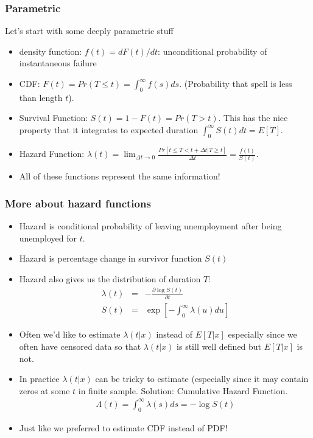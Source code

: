 \documentclass[xcolor=pdftex,dvipsnames,table,mathserif]{beamer}
\begin{document}
\begin{frame}
\frametitle{Parametric}
Let's start with some deeply parametric stuff
\begin{itemize}
\item density function: $f(t) = d F(t) / dt$: unconditional probability of instantaneous failure
\item CDF: $F(t) = Pr(T \leq t) = \int_0^{\infty} f(s) d s$. (Probability that spell is less than length $t$).
\item Survival Function: $S(t) = 1- F(t) = Pr( T > t)$. This has the nice property that it integrates to expected duration $\int_0^{\infty} S(t) d t = E[T]$.
\item Hazard Function: $\lambda(t)  = \lim_{\Delta t \rightarrow 0} \frac{Pr[t \leq T < t+ \Delta t | T \geq t]}{\Delta t} = \frac{f(t)}{S(t)}$.
\item \alert{All of these functions represent the same information!}
\end{itemize}
\end{frame}

\begin{frame}
\frametitle{More about hazard functions}
\begin{itemize}
\item Hazard is conditional probability of leaving unemployment after being unemployed for $t$.
\item Hazard is percentage change in survivor function $S(t)$
\item Hazard also gives us the distribution of duration $T$:
\begin{eqnarray*}
\lambda(t) &=& - \frac{\partial \log S(t)}{\partial t}\\
S(t) &=& \exp \left[ - \int_0^{\infty} \lambda(u) d u \right]
\end{eqnarray*}
\item Often we'd like to estimate $\lambda(t | x)$ instead of $E[T | x]$ especially since we often have \alert{censored} data so that  $\lambda(t | x)$ is still well defined but $E[T | x]$ is not.
\item In practice  $\lambda(t | x)$ can be tricky to estimate (especially since it may contain zeros at some $t$ in finite sample. Solution: \alert{Cumulative Hazard Function}.
\begin{eqnarray*}
\Lambda(t) = \int_0^{\infty} \lambda(s) d s = - \log S(t)
\end{eqnarray*}
\item Just like we preferred to estimate CDF instead of PDF!
\end{itemize}
\end{frame}
\end{document}
